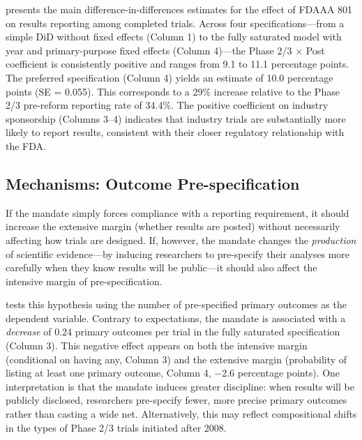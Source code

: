 \documentclass[12pt]{article}
\begin{document}
 presents the main difference-in-differences estimates for the effect of FDAAA 801 on results reporting among completed trials. Across four specifications---from a simple DiD without fixed effects (Column 1) to the fully saturated model with year and primary-purpose fixed effects (Column 4)---the Phase 2/3 $\times$ Post coefficient is consistently positive and ranges from 9.1 to 11.1 percentage points. The preferred specification (Column 4) yields an estimate of 10.0 percentage points (SE = 0.055). This corresponds to a 29\% increase relative to the Phase 2/3 pre-reform reporting rate of 34.4\%. The positive coefficient on industry sponsorship (Columns 3--4) indicates that industry trials are substantially more likely to report results, consistent with their closer regulatory relationship with the FDA.



\subsection{Mechanisms: Outcome Pre-specification}

If the mandate simply forces compliance with a reporting requirement, it should increase the extensive margin (whether results are posted) without necessarily affecting how trials are designed. If, however, the mandate changes the \textit{production} of scientific evidence---by inducing researchers to pre-specify their analyses more carefully when they know results will be public---it should also affect the intensive margin of pre-specification.

 tests this hypothesis using the number of pre-specified primary outcomes as the dependent variable. Contrary to expectations, the mandate is associated with a \textit{decrease} of 0.24 primary outcomes per trial in the fully saturated specification (Column 3). This negative effect appears on both the intensive margin (conditional on having any, Column 3) and the extensive margin (probability of listing at least one primary outcome, Column 4, $-$2.6 percentage points). One interpretation is that the mandate induces greater discipline: when results will be publicly disclosed, researchers pre-specify fewer, more precise primary outcomes rather than casting a wide net. Alternatively, this may reflect compositional shifts in the types of Phase 2/3 trials initiated after 2008.


\end{document}
